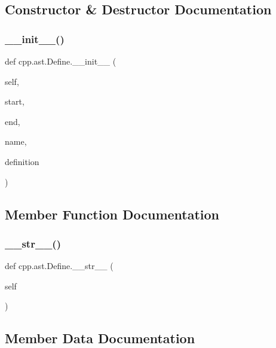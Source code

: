 \subsection{Constructor \& Destructor Documentation}
\mbox{\label{classcpp_1_1ast_1_1Define_ae9af61866e010a863ba9f8818ec8924c}} 
\subsubsection{\texorpdfstring{\_\_init\_\_()}{\_\_init\_\_()}}
{\footnotesize\ttfamily def cpp.\+ast.\+Define.\+\_\+\+\_\+init\+\_\+\+\_\+ (\begin{DoxyParamCaption}\item[{}]{self,  }\item[{}]{start,  }\item[{}]{end,  }\item[{}]{name,  }\item[{}]{definition }\end{DoxyParamCaption})}



\subsection{Member Function Documentation}
\mbox{\label{classcpp_1_1ast_1_1Define_aa89732914b19901c8d291e11f34bb627}} 
\subsubsection{\texorpdfstring{\_\_str\_\_()}{\_\_str\_\_()}}
{\footnotesize\ttfamily def cpp.\+ast.\+Define.\+\_\+\+\_\+str\+\_\+\+\_\+ (\begin{DoxyParamCaption}\item[{}]{self }\end{DoxyParamCaption})}



\subsection{Member Data Documentation}
\mbox{\label{classcpp_1_1ast_1_1Define_a0c636652dfeb2f15e62793afea1153c9}} 

